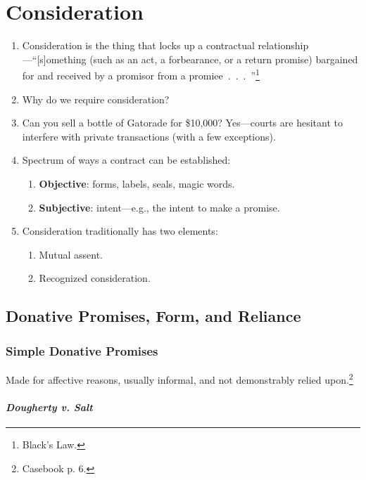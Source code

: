 \section{Consideration}

\begin{enumerate}
    \item Consideration is the thing that locks up a contractual 
    relationship---``[s]omething (such as an act, a forbearance, or a return 
    promise) bargained for and received by a promisor from a 
    promiee~.~.~.~''\footnote{Black's Law.}
    \item Why do we require consideration?
    \item Can you sell a bottle of Gatorade for \$10,000? Yes---courts are 
    hesitant to interfere with private transactions (with a few exceptions).
    \item Spectrum of ways a contract can be established:
    \begin{enumerate}
        \item \textbf{Objective}: forms, labels, seals, magic words.
        \item \textbf{Subjective}: intent---e.g., the intent to make a 
        promise.
    \end{enumerate}
    \item Consideration traditionally has two elements:
    \begin{enumerate}
        \item Mutual assent.
        \item Recognized consideration.
    \end{enumerate}
\end{enumerate}

\subsection{Donative Promises, Form, and Reliance}

\subsubsection{Simple Donative Promises}

Made for affective reasons, usually informal, and not demonstrably relied 
upon.\footnote{Casebook p. 6.}

\paragraph{\emph{Dougherty v. Salt}}

